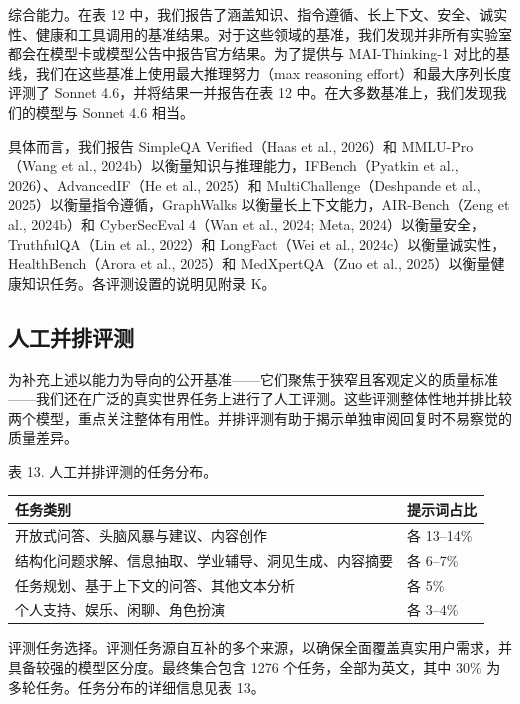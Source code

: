 \documentclass[
  10
]{article}
\newcounter{none} %
\begin{document}
综合能力。在表 12 中，我们报告了涵盖知识、指令遵循、长上下文、安全、诚实性、健康和工具调用的基准结果。对于这些领域的基准，我们发现并非所有实验室都会在模型卡或模型公告中报告官方结果。为了提供与 MAI-Thinking-1 对比的基线，我们在这些基准上使用最大推理努力（max reasoning effort）和最大序列长度评测了 Sonnet 4.6，并将结果一并报告在表 12 中。在大多数基准上，我们发现我们的模型与 Sonnet 4.6 相当。

具体而言，我们报告 SimpleQA Verified（Haas et al., 2026）和 MMLU-Pro（Wang et al., 2024b）以衡量知识与推理能力，IFBench（Pyatkin et al., 2026）、AdvancedIF（He et al., 2025）和 MultiChallenge（Deshpande et al., 2025）以衡量指令遵循，GraphWalks 以衡量长上下文能力，AIR-Bench（Zeng et al., 2024b）和 CyberSecEval 4（Wan et al., 2024; Meta, 2024）以衡量安全，TruthfulQA（Lin et al., 2022）和 LongFact（Wei et al., 2024c）以衡量诚实性，HealthBench（Arora et al., 2025）和 MedXpertQA（Zuo et al., 2025）以衡量健康知识任务。各评测设置的说明见附录 K。

\subsection{人工并排评测}\label{human-sidebyside-evaluations}

为补充上述以能力为导向的公开基准——它们聚焦于狭窄且客观定义的质量标准——我们还在广泛的真实世界任务上进行了人工评测。这些评测整体性地并排比较两个模型，重点关注整体有用性。并排评测有助于揭示单独审阅回复时不易察觉的质量差异。

表 13. 人工并排评测的任务分布。

{\def\LTcaptype{none} %
\begin{longtable}[]{@{}|l|l|@{}}
\toprule\noalign{}
\endhead
\bottomrule\noalign{}
\endlastfoot
\hline
任务类别 & 提示词占比 \\
\hline
开放式问答、头脑风暴与建议、内容创作 & 各 13--14\% \\
\hline
结构化问题求解、信息抽取、学业辅导、洞见生成、内容摘要 & 各 6--7\% \\
\hline
任务规划、基于上下文的问答、其他文本分析 & 各 5\% \\
\hline
个人支持、娱乐、闲聊、角色扮演 & 各 3--4\% \\
\hline
\end{longtable}
}

评测任务选择。评测任务源自互补的多个来源，以确保全面覆盖真实用户需求，并具备较强的模型区分度。最终集合包含 1276 个任务，全部为英文，其中 30\% 为多轮任务。任务分布的详细信息见表 13。
\end{document}
